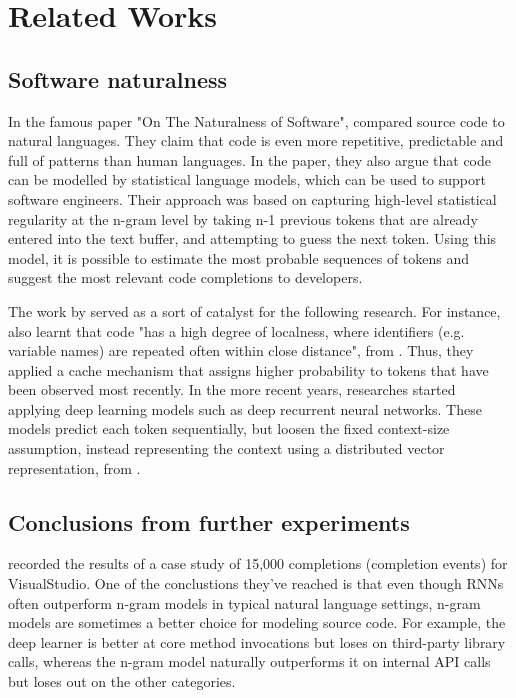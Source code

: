 \chapter{Related Works}
\label{chap:Related Works}

\section{Software naturalness}
In the famous paper "On The Naturalness of Software", \cite{Hind12a} compared source code
to natural languages. They claim that code is even more repetitive, predictable and full of
patterns than human languages. In the paper, they also argue that code can be modelled by
statistical language models, which can be used to support software engineers. Their approach
was based on capturing high-level statistical regularity at the n-gram level by taking n-1
previous tokens that are already entered into the text buffer, and attempting to guess the
next token. Using this model, it is possible to estimate the most probable sequences of tokens
and suggest the most relevant code completions to developers.

The work by \cite{Hind12a} served as a sort of catalyst for the following research. For
instance, \cite{Tu14a} also learnt that code "has a high degree of localness, where identifiers
(e.g. variable names) are repeated often within close distance", from \cite{Alla18a}. Thus,
they applied a cache mechanism that assigns higher probability to tokens that have been observed
most recently. In the more recent years, researches started applying deep learning models such
as deep recurrent neural networks. These models predict each token sequentially, but loosen the
fixed context-size assumption, instead representing the context using a distributed vector
representation, from \cite{Alla18a}.

\section{Conclusions from further experiments}
\cite{Hell19a} recorded the results of a case study of 15,000 completions
(completion events) for VisualStudio. One of the conclustions they've reached is that even though
RNNs often outperform n-gram models in typical natural language settings, n-gram models are
sometimes a better choice for modeling source code. For example, the deep learner is better at
core method invocations but loses on third-party library calls, whereas the n-gram model
naturally outperforms it on internal API calls but loses out on the other categories.

